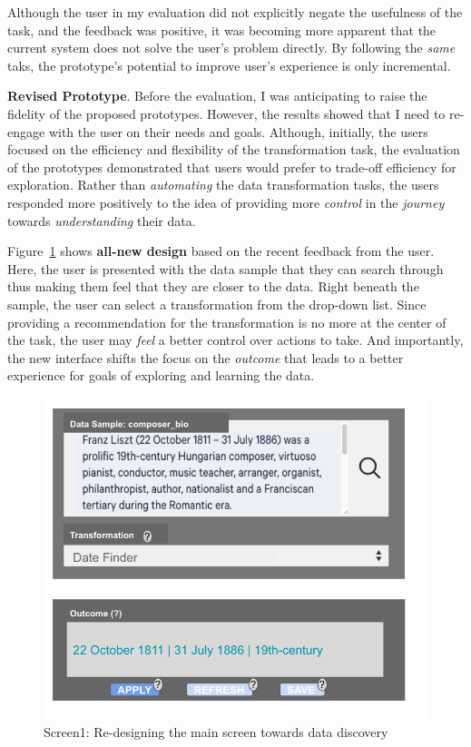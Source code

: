 \documentclass[12pt,letterpaper]{article}
\begin{document}
Although the user in my evaluation did not explicitly negate the usefulness of the task, and the feedback was positive, it was becoming more apparent that the current system does not solve the user's problem directly. By following the \textit{same} taks, the prototype's potential to improve user's experience is only incremental. 

\textbf{Revised Prototype}. Before the evaluation, I was anticipating to raise the fidelity of the proposed prototypes. However, the results showed that I need to re-engage with the user on their needs and goals. Although, initially, the users focused on the efficiency and flexibility of the transformation task, the evaluation of the prototypes demonstrated that users would prefer to trade-off efficiency for exploration. Rather than \textit{automating} the data transformation tasks, the users responded more positively to the idea of providing more \textit{control} in the \textit{journey} towards \textit{understanding} their data. 

Figure~\ref{fig::2} shows \textbf{all-new design} based on the recent feedback from the user. Here, the user is presented with the data sample that they can search through thus making them feel that they are closer to the data. Right beneath the sample, the user can select a transformation from the drop-down list. Since providing a recommendation for the transformation is no more at the center of the task, the user may \textit{feel} a better control over actions to take. And importantly, the new interface shifts the focus on the \textit{outcome} that leads to a better experience for goals of exploring and learning the data. 

\begin{figure}[h]
\centering
\includegraphics[scale=.4]{figures/m3/interface_redesign_screen1.png}
\caption{Screen1: Re-designing the main screen towards data discovery}
\label{fig::2}
\end{figure}
\end{document}
